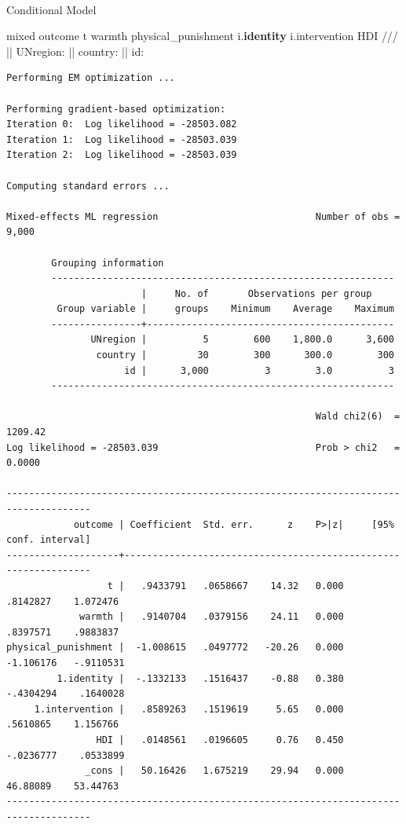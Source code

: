 \documentclass[
  letterpaper,
  DIV=11,
  numbers=noendperiod]{scrreprt}
\makeatletter
\let\oldparagraph\paragraph
\renewcommand{\paragraph}{
    \@ifstar
      \xxxParagraphStar
      \xxxParagraphNoStar
  }
\newcommand{\xxxParagraphStar}[1]{\oldparagraph*{#1}\mbox{}}
\newcommand{\xxxParagraphNoStar}[1]{\oldparagraph{#1}\mbox{}}
\newenvironment{Shaded}{\begin{snugshade}}{\end{snugshade}}
\newcommand{\CommentTok}[1]{\textcolor[rgb]{0.37,0.37,0.37}{#1}}
\newcommand{\KeywordTok}[1]{\textcolor[rgb]{0.00,0.23,0.31}{\textbf{#1}}}
\newcommand{\NormalTok}[1]{\textcolor[rgb]{0.00,0.23,0.31}{#1}}
\makeatother
\begin{document}
\paragraph{Conditional Model}\label{conditional-model}

\begin{Shaded}
\begin{Highlighting}[]

\NormalTok{mixed outcome t warmth physical\_punishment i.}\KeywordTok{identity}\NormalTok{ i.intervention HDI }\CommentTok{///}
\NormalTok{|| UNregion: || country: || id:}
  
\end{Highlighting}
\end{Shaded}

\begin{verbatim}
Performing EM optimization ...

Performing gradient-based optimization: 
Iteration 0:  Log likelihood = -28503.082  
Iteration 1:  Log likelihood = -28503.039  
Iteration 2:  Log likelihood = -28503.039  

Computing standard errors ...

Mixed-effects ML regression                            Number of obs =   9,000

        Grouping information
        -------------------------------------------------------------
                        |     No. of       Observations per group
         Group variable |     groups    Minimum    Average    Maximum
        ----------------+--------------------------------------------
               UNregion |          5        600    1,800.0      3,600
                country |         30        300      300.0        300
                     id |      3,000          3        3.0          3
        -------------------------------------------------------------

                                                       Wald chi2(6)  = 1209.42
Log likelihood = -28503.039                            Prob > chi2   =  0.0000

-------------------------------------------------------------------------------------
            outcome | Coefficient  Std. err.      z    P>|z|     [95% conf. interval]
--------------------+----------------------------------------------------------------
                  t |   .9433791   .0658667    14.32   0.000     .8142827    1.072476
             warmth |   .9140704   .0379156    24.11   0.000     .8397571    .9883837
physical_punishment |  -1.008615   .0497772   -20.26   0.000    -1.106176   -.9110531
         1.identity |  -.1332133   .1516437    -0.88   0.380    -.4304294    .1640028
     1.intervention |   .8589263   .1519619     5.65   0.000     .5610865    1.156766
                HDI |   .0148561   .0196605     0.76   0.450    -.0236777    .0533899
              _cons |   50.16426   1.675219    29.94   0.000     46.88089    53.44763
-------------------------------------------------------------------------------------


\end{verbatim}
\end{document}
